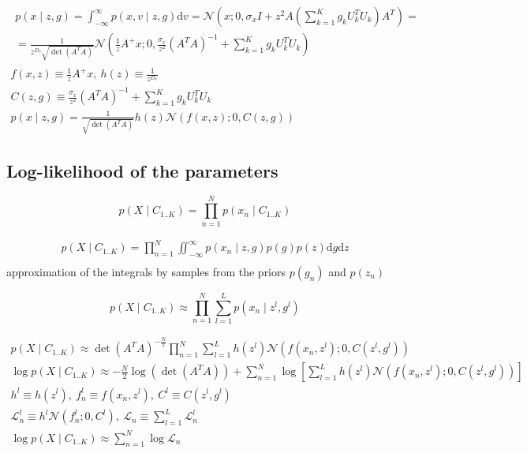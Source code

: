 \documentclass{paper}
\begin{document}
\begin{eqnarray}
\begin{split}
p(x \mid z,g) = \int_{-\infty}^{\infty} p(x,v \mid z,g)  \mathrm{d}v = \mathcal{N}(x;0,\sigma_x I + z^2 A \left( \sum_{k=1}^K g_k U_k^T U_k \right)A^T) =\\
= \frac{1}{z^{D_v} \sqrt{\det(A^TA)}} \mathcal{N}(\frac{1}{z}A^{+}x;0,\frac{\sigma_x}{z^2} (A^TA)^{-1} + \sum_{k=1}^K g_k U_k^T U_k) 
\end{split} \\
f(x,z) \equiv \frac{1}{z}A^{+}x, ~ h(z) \equiv  \frac{1}{z^{D_v} } \\
C(z,g) \equiv \frac{\sigma_x}{z^2} (A^TA)^{-1} + \sum_{k=1}^K g_k U_k^T U_k \\
p(x \mid z,g) = \frac{1}{\sqrt{\det(A^TA)}} h(z) \mathcal{N}(f(x,z);0,C(z,g))
\end{eqnarray}

\subsection{Log-likelihood of the parameters}

\begin{equation}
p(X \mid C_{1..K}) = \prod_{n=1}^N p(x_n \mid C_{1..K}) 
\end{equation}

\begin{eqnarray}
p(X \mid C_{1..K}) = \prod_{n=1}^N \iint_{-\infty}^{\infty} p(x_n \mid z,g) p(g) p(z) \mathrm{d}g\mathrm{d}z \\
\end{eqnarray}
%
approximation of the integrals by samples from the priors $p(g_n)$ and $p(z_n)$

\begin{equation}
p(X \mid C_{1..K}) \approx \prod_{n=1}^N \sum_{l=1}^{L}p(x_n \mid z^l,g^l)
\end{equation}

\begin{eqnarray}
p(X \mid C_{1..K}) \approx \det(A^TA)^{-\frac{N}{2}} \prod_{n=1}^N \sum_{l=1}^{L} h(z^l) \mathcal{N}(f(x_n,z^l);0,C(z^l,g^l)) \\
\log p(X \mid C_{1..K}) \approx -\frac{N}{2} \log(\det(A^TA)) + \sum_{n=1}^N \log \left[ \sum_{l=1}^{L} h(z^l) \mathcal{N}(f(x_n,z^l);0,C(z^l,g^l)) \right] \\
h^l \equiv h(z^l), ~ f_n^l \equiv f(x_n,z^l), ~ C^l \equiv C(z^l,g^l) \\
\mathcal{L}_n^l \equiv h^l \mathcal{N}(f_n^l;0,C^l), ~ \mathcal{L}_n \equiv  \sum_{l=1}^{L} \mathcal{L}_n^l \\
\log p(X \mid C_{1..K}) \approx \sum_{n=1}^N \log \mathcal{L}_n
\end{eqnarray}
\end{document}

